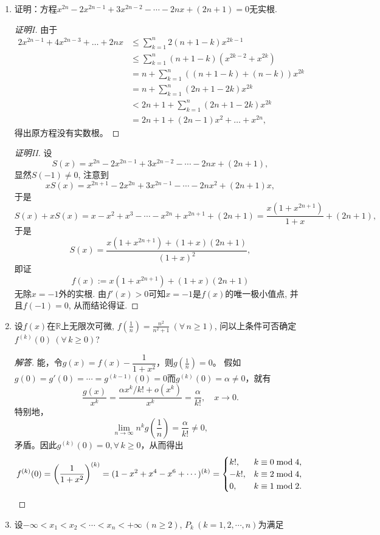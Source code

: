 \begin{5b}
\begin{enumerate}
\begin{proof}[解答]
\end{proof}
\item 证明：方程\(x^{2n}-2x^{2n-1}+3x^{2n-2}-\cdots-2nx+(2n+1)=0\)无实根.
\begin{proof}[证明I]
由于
\begin{align*}
2x^{2n-1}+4x^{2n-3}+\ldots+2nx 
& \leqslant \sum_{k=1}^n 2(n+1-k) x^{2k-1} \\
& \leqslant \sum_{k=1}^n(n+1-k)(x^{2k-2}+x^{2k}) \\
& =n+\sum_{k=1}^n((n+1-k)+(n-k)) x^{2k} \\
& =n+\sum_{k=1}^n(2n+1-2k) x^{2k} \\
& <2n+1+\sum_{k=1}^n(2n+1-2k) x^{2k} \\
& =2n+1+(2n-1)x^2+\ldots+x^{2n},
\end{align*}
得出原方程没有实数根。
\end{proof}
\begin{proof}[证明II]
设\[S(x)=x^{2n}-2x^{2n-1}+3x^{2n-2}-\cdots-2nx+(2n+1),\]
显然\(S(-1)\ne 0\), 注意到
\[xS(x)=x^{2n+1}-2x^{2n}+3x^{2n-1}-\cdots-2nx^2+(2n+1)x,\]
于是\[S(x)+xS(x)=x-x^2+x^3-\cdots-x^{2n}+x^{2n+1}+(2n+1)
=\frac{x(1+x^{2n+1})}{1+x}+(2n+1),\]
于是\[S(x)=\frac{x(1+x^{2n+1})+(1+x)(2n+1)}{(1+x)^2},\]
即证\[f(x):=x(1+x^{2n+1})+(1+x)(2n+1)\]无除\(x=-1\)外的实根. 
由\(f'(x)>0\)可知\(x=-1\)是\(f(x)\)的唯一极小值点, 并且\(f(-1)=0\), 从而结论得证.
\end{proof}
\item 设\(f(x)\)在\(\mathbb{R}\)上无限次可微, 
\(f\left(\frac{1}{n}\right)=\frac{n^2}{n^2+1}\ (\forall\,n\geqslant1)\), 
问以上条件可否确定\(f^{(k)}(0)\ (\forall\,k\geqslant 0)\)?
\begin{proof}[解答]
能，令\(g(x)=f(x)-\dfrac{1}{1+x^2}\)，则\(g\left(\frac{1}{n}\right)=0\)。
假如$g(0)=g'(0)=\cdots=g^{(k-1)}(0)=0$而$g^{(k)}(0)=\alpha\ne0$，就有
\[\frac{g(x)}{x^k}=\frac{\alpha x^k/k!+o(x^k)}{x^k}
=\frac{\alpha}{k!}, \quad x\to0.\]
特别地，\[\lim_{n\to\infty}n^kg\left(\frac{1}{n}\right)=\frac{\alpha}{k!}\ne0,\]
矛盾。因此$g^{(k)}(0)=0,\forall\,k\geqslant0$，从而得出
\[f^{(k)}(0)=\left(\frac{1}{1+x^2}\right)^{(k)}
=(1-x^2+x^4-x^6+\cdots)^{(k)}
=\begin{cases}k!,&k\equiv0\bmod4,\\
    -k!,&k\equiv2\bmod4,\\0,&k\equiv1\bmod2.
\end{cases}\qedhere\]
\end{proof}
\item 设\(-\infty<x_1<x_2<\cdots<x_n<+\infty\ (n\geqslant 2)\), 
\(P_k\ (k=1,2,\cdots,n)\)为满足

\end{enumerate}
\end{5b}
